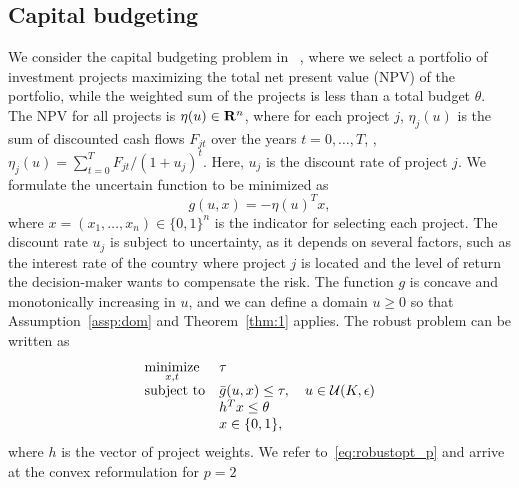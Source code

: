 \documentclass[12pt]{article}
\theoremstyle{thmstyleone}%
\theoremstyle{thmstyletwo}%
\theoremstyle{thmstylethree}%
\begin{document}
\subsection{Capital budgeting}
\label{sub:capitalbudget}
We consider the capital budgeting problem in ~\cite[Section 4.2]{ben-tal_deriving_2015}, where we select a portfolio of investment projects maximizing the total net present value (NPV) of the portfolio, while the weighted sum of the projects is less than a total budget $\theta$.
The NPV for all projects is $\eta(u) \in {\mathbf R}^n$, where for each project $j$, $\eta_j(u)$ is the sum of discounted cash flows $F_{jt}$ over the years $t = 0,\dots, T$, \ie, $\eta_j(u) = \sum_{t = 0}^T F_{jt}/(1+u_j)^t$. Here, $u_j$ is the discount rate of project $j$.
We formulate the uncertain function to be minimized as
\begin{equation*}
	 g(u,x) = -\eta(u)^Tx,
\end{equation*}
where $x = (x_1, \dots, x_n) \in \{0,1\}^n$ is the indicator for selecting each project.
The discount rate $u_j$ is subject to uncertainty, as it depends on several factors, such as the interest rate of the country where project $j$ is located and the level of return the decision-maker wants to compensate the risk.
The function $g$ is concave and monotonically increasing in $u$, and we can define a domain $u \geq 0$ so that Assumption~\ref{assp:dom} and Theorem~\ref{thm:1} applies.
The robust problem can be written as
\begin{equation*}
	\begin{array}{ll}
	\underset{x, t}{\text{minimize}} & \tau\\
	\text{subject to} & \bar{g}(u,x) \leq \tau,\quad u \in {\mathcal{U}}(K,\epsilon)\\
	& h^Tx \leq \theta\\
& x\in \{0,1\},
\end{array}
\end{equation*}
where $h$ is the vector of project weights. We refer to~\eqref{eq:robustopt_p} and arrive at the convex reformulation for $p =2$
\end{document}
